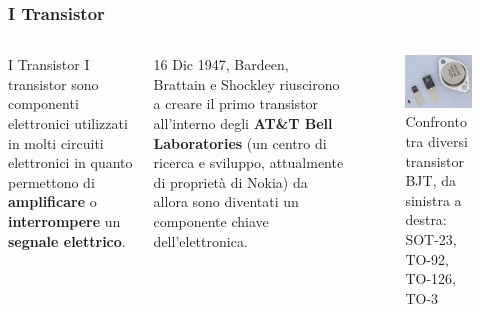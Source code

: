 \begin{frame}
	\frametitle{I Transistor}
	
	\begin{columns}			
		\begin{block}{I Transistor}
			I transistor sono componenti elettronici utilizzati in molti circuiti elettronici in quanto permettono di \textbf{amplificare} o \textbf{interrompere} un \textbf{segnale elettrico}.
		\end{block}
		
		\begin{block}{16 Dic 1947, Bardeen, Brattain e Shockley riuscirono a creare il primo transistor}
			all'interno degli \textbf{AT\&T Bell Laboratories} (un centro di ricerca e sviluppo, attualmente di proprietà di Nokia) da allora sono diventati un componente chiave dell'elettronica.
		\end{block}
		
		\begin{figure}[!htbp]
			\centering 
			\includegraphics[width=0.95\linewidth]{images/2_elettronica/transistors.jpg}
			\caption{Confronto tra diversi transistor BJT, da sinistra a destra: SOT-23, TO-92, TO-126, TO-3}
		\end{figure}		
	\end{columns}
	
\end{frame}



